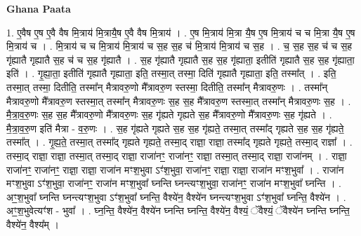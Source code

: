 \documentclass[17pt]{extarticle}
\begin{document}
\textbf{Ghana Paata } \newline

1. ए॒वैष ए॒ष ए॒वै वैष मि॒त्राय॑ मि॒त्रायै॒ष ए॒वै वैष मि॒त्राय॑ । . ए॒ष मि॒त्राय॑ मि॒त्रा यै॒ष ए॒ष मि॒त्राय॑ च च मि॒त्रा यै॒ष ए॒ष मि॒त्राय॑ च । . मि॒त्राय॑ च च मि॒त्राय॑ मि॒त्राय॑ च स॒ह स॒ह च॑ मि॒त्राय॑ मि॒त्राय॑ च स॒ह । . च॒ स॒ह स॒ह च॑ च स॒ह गृ॑ह्यातै गृह्यातै स॒ह च॑ च स॒ह गृ॑ह्यातै । . स॒ह गृ॑ह्यातै गृह्यातै स॒ह स॒ह गृ॑ह्याता॒ इतीति॑ गृह्यातै स॒ह स॒ह गृ॑ह्याता॒ इति॑ । . गृ॒ह्या॒ता॒ इतीति॑ गृह्यातै गृह्याता॒ इति॒ तस्मा॒त् तस्मा॒ दिति॑ गृह्यातै गृह्याता॒ इति॒ तस्मा᳚त् । . इति॒ तस्मा॒त् तस्मा॒ दितीति॒ तस्मा᳚न् मैत्रावरु॒णो मै᳚त्रावरु॒ण स्तस्मा॒ दितीति॒ तस्मा᳚न् मैत्रावरु॒णः । . तस्मा᳚न् मैत्रावरु॒णो मै᳚त्रावरु॒ण स्तस्मा॒त् तस्मा᳚न् मैत्रावरु॒णः स॒ह स॒ह मै᳚त्रावरु॒ण स्तस्मा॒त् तस्मा᳚न् मैत्रावरु॒णः स॒ह । . मै॒त्रा॒व॒रु॒णः स॒ह स॒ह मै᳚त्रावरु॒णो मै᳚त्रावरु॒णः स॒ह गृ॑ह्यते गृह्यते स॒ह मै᳚त्रावरु॒णो मै᳚त्रावरु॒णः स॒ह गृ॑ह्यते । . मै॒त्रा॒व॒रु॒ण इति॑ मैत्रा - व॒रु॒णः । . स॒ह गृ॑ह्यते गृह्यते स॒ह स॒ह गृ॑ह्यते॒ तस्मा॒त् तस्मा᳚द् गृह्यते स॒ह स॒ह गृ॑ह्यते॒ तस्मा᳚त् । . गृ॒ह्य॒ते॒ तस्मा॒त् तस्मा᳚द् गृह्यते गृह्यते॒ तस्मा॒द् राज्ञा॒ राज्ञा॒ तस्मा᳚द् गृह्यते गृह्यते॒ तस्मा॒द् राज्ञा᳚ । . तस्मा॒द् राज्ञा॒ राज्ञा॒ तस्मा॒त् तस्मा॒द् राज्ञा॒ राजा॑नꣳ॒॒ राजा॑नꣳ॒॒ राज्ञा॒ तस्मा॒त् तस्मा॒द् राज्ञा॒ राजा॑नम् । . राज्ञा॒ राजा॑नꣳ॒॒ राजा॑नꣳ॒॒ राज्ञा॒ राज्ञा॒ राजा॑न मꣳश॒भुवा ऽꣳ॑श॒भुवा॒ राजा॑नꣳ॒॒ राज्ञा॒ राज्ञा॒ राजा॑न मꣳश॒भुवा᳚ । . राजा॑न मꣳश॒भुवा ऽꣳ॑श॒भुवा॒ राजा॑नꣳ॒॒ राजा॑न मꣳश॒भुवा᳚ घ्नन्ति घ्नन्त्यꣳश॒भुवा॒ राजा॑नꣳ॒॒ राजा॑न मꣳश॒भुवा᳚ घ्नन्ति । . अꣳ॒॒श॒भुवा᳚ घ्नन्ति घ्नन्त्यꣳश॒भुवा ऽꣳ॑श॒भुवा᳚ घ्नन्ति॒ वैश्ये॑न॒ वैश्ये॑न 
घ्नन्त्यꣳश॒भुवा ऽꣳ॑श॒भुवा᳚ घ्नन्ति॒ वैश्ये॑न । . अꣳ॒॒श॒भुवेत्यꣳ॑श - भुवा᳚ । . घ्न॒न्ति॒ वैश्ये॑न॒ वैश्ये॑न घ्नन्ति घ्नन्ति॒ वैश्ये॑न॒ वैश्यं॒ ॅवैश्यं॒ ॅवैश्ये॑न घ्नन्ति घ्नन्ति॒ वैश्ये॑न॒ वैश्य᳚म् । \newline
\end{document}
